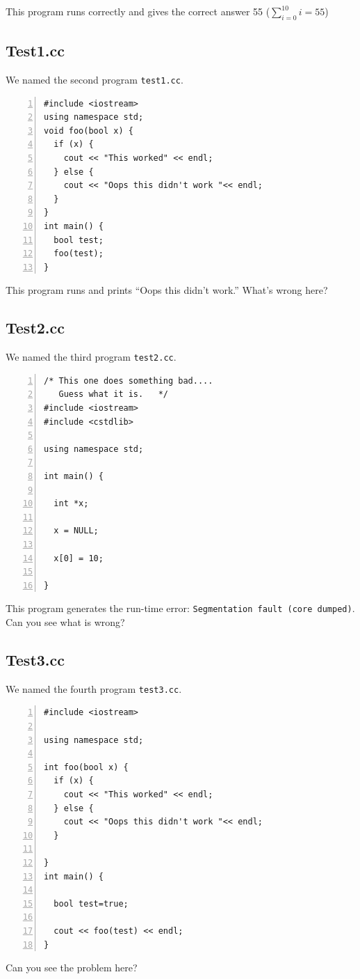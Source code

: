\documentclass[12pt]{article}
\begin{document}
This program runs correctly and gives the correct answer 55 ($\sum\limits_{i=0}^{10} i = 55$)

\subsection{Test1.cc}
We named the second program \verb+test1.cc+.

\begin{Verbatim}[numbers=left,frame=single]
#include <iostream>
using namespace std;
void foo(bool x) {
  if (x) {
    cout << "This worked" << endl;
  } else {
    cout << "Oops this didn't work "<< endl;
  }
}
int main() {
  bool test;
  foo(test);
}
\end{Verbatim}
This program runs and prints ``Oops this didn't work.''
What's wrong here?
\subsection{Test2.cc}
We named the third program \verb+test2.cc+.
\begin{Verbatim}[numbers=left,frame=single]
/* This one does something bad....
   Guess what it is.   */
#include <iostream>
#include <cstdlib>

using namespace std;

int main() {

  int *x;

  x = NULL;

  x[0] = 10;

}
\end{Verbatim}
This program generates the run-time error: \verb+Segmentation fault (core dumped)+.
Can you see what is wrong?

\subsection{Test3.cc}
We named the fourth program \verb+test3.cc+.
\begin{Verbatim}[numbers=left,frame=single]
#include <iostream>

using namespace std;

int foo(bool x) {
  if (x) {
    cout << "This worked" << endl;
  } else {
    cout << "Oops this didn't work "<< endl;
  }

}
int main() {

  bool test=true;

  cout << foo(test) << endl;
}
\end{Verbatim}
Can you see the problem here?
\end{document}
